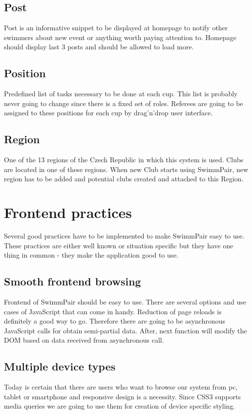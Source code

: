 \subsection*{Post}
\par
Post is an informative snippet to be displayed at homepage to notify other swimmers about new event or anything worth paying attention to. Homepage should display last 3 posts and should be allowed to load more.
\subsection*{Position}
Predefined list of tasks necessary to be done at each cup. This list is probably never going to change since there is a fixed set of roles. Referees are going to be assigned to these positions for each cup by drag'n'drop user interface.
\subsection*{Region}
One of the 13 regions of the Czech Republic in which this system is used. Clubs are located in one of these regions. When new Club starts using SwimmPair, new region has to be added and potential clubs created and attached to this Region. 
\newpage
\section{Frontend practices}
Several good practices have to be implemented to make SwimmPair easy to use. These practices are either well known or situation specific but they have one thing in common - they make the application good to use.
\subsection*{Smooth frontend browsing}
\par
Frontend of SwimmPair should be easy to use. There are several options and use cases of JavaScript that can come in handy. Reduction of page reloads is definitely a good way to go. Therefore there are going to be asynchronous JavaScript calls for obtain semi-partial data. After, next function will modify the DOM based on data received from asynchronous call. 
\subsection*{Multiple device types}
\par
Today is certain that there are users who want to browse our system from pc, tablet or smartphone and responsive design is a necessity. Since CSS3 supports media queries we are going to use them for creation of device specific styling.
